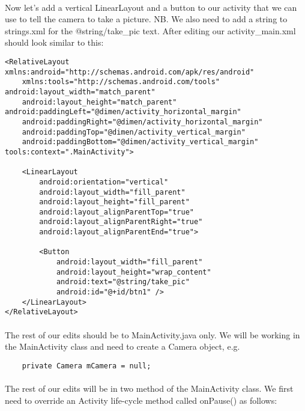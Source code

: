 \paragraph{} Now let's add a vertical LinearLayout and a button to our activity that we can use to tell the camera to take a picture. NB. We also need to add a string to strings.xml for the @string/take\_pic text. After editing our activity\_main.xml should look similar to this:

\begin{lstlisting}
<RelativeLayout xmlns:android="http://schemas.android.com/apk/res/android"
    xmlns:tools="http://schemas.android.com/tools" android:layout_width="match_parent"
    android:layout_height="match_parent" android:paddingLeft="@dimen/activity_horizontal_margin"
    android:paddingRight="@dimen/activity_horizontal_margin"
    android:paddingTop="@dimen/activity_vertical_margin"
    android:paddingBottom="@dimen/activity_vertical_margin" tools:context=".MainActivity">

    <LinearLayout
        android:orientation="vertical"
        android:layout_width="fill_parent"
        android:layout_height="fill_parent"
        android:layout_alignParentTop="true"
        android:layout_alignParentRight="true"
        android:layout_alignParentEnd="true">

        <Button
            android:layout_width="fill_parent"
            android:layout_height="wrap_content"
            android:text="@string/take_pic"
            android:id="@+id/btn1" />
    </LinearLayout>
</RelativeLayout>
\end{lstlisting}

\paragraph{} The rest of our edits should be to MainActivity.java only. We will be working in the MainActivity class and need to create a Camera object, e.g.

\begin{lstlisting}
    private Camera mCamera = null;
\end{lstlisting}

\paragraph{} The rest of our edits will be in two method of the MainActivity class. We first need to override an Activity life-cycle method called onPause() as follows:

